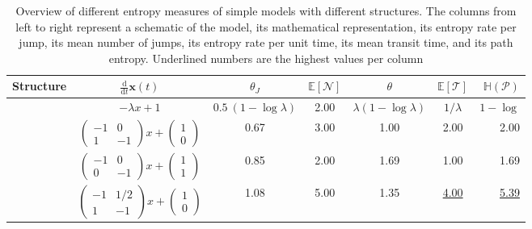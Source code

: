 \documentclass{article}
\begin{document}
\begin{landscape}

\begin{table}[htbp]
   \centering
   \caption{Overview of different entropy measures of simple models with different structures. The columns from left to right represent a schematic of the model, its mathematical representation, its entropy rate per jump, its mean number of jumps, its entropy rate per unit time, its mean transit time, and its path entropy. Underlined numbers are the highest values per column }
   \begin{tabular}{@{} ccccccr @{}} %
      \toprule
      Structure    & $\frac{\mathrm{d}}{\mathrm{d}t} \mathbf{x} (t)$ & $\theta_J$ & $\mathbb{E} [\mathcal{N}]$ & $\theta$ & $\mathbb{E} [\mathcal{T}]$ & $\mathbb{H} (\mathcal{P})$ \\
      \midrule
         & $-\lambda x +1$ & $0.5 \ (1 - \log \lambda)$ & 2.00 & $\lambda (1 - \log \lambda)$ & $1/ \lambda$ & $1 - \log$ \\
           & $\left( \begin{matrix} -1 & 0 \\ 1 & -1  \end{matrix} \right) x + \left( \begin{matrix} 1 \\ 0 \end{matrix} \right)$ & 0.67 & 3.00 & 1.00 & 2.00 & 2.00  \\
           & $\left( \begin{matrix} -1 & 0 \\ 0 & -1  \end{matrix} \right) x + \left( \begin{matrix} 1 \\ 1 \end{matrix} \right)$ & 0.85 & 2.00 & 1.69 & 1.00 & 1.69 \\
           & $\left( \begin{matrix} -1 & 1/2 \\ 1 & -1  \end{matrix} \right) x + \left( \begin{matrix} 1 \\ 0 \end{matrix} \right)$ & 1.08 & 5.00 & 1.35 & \underline{4.00} & \underline{5.39} \\

\end{tabular}
\end{table}
\end{landscape}
\end{document}

